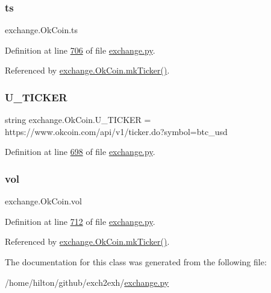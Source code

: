 \mbox{\label{classexchange_1_1_ok_coin_a0fe6263a7f58a6fa8a688929976b7e4a}} 
\subsubsection{\texorpdfstring{ts}{ts}}
{\footnotesize\ttfamily exchange.\+Ok\+Coin.\+ts}



Definition at line \hyperlink{exchange_8py_source_l00706}{706} of file \hyperlink{exchange_8py_source}{exchange.\+py}.



Referenced by \hyperlink{exchange_8py_source_l00730}{exchange.\+Ok\+Coin.\+mk\+Ticker()}.

\mbox{\label{classexchange_1_1_ok_coin_a81305ced2eb23b94feb7195d1d42afc2}} 
\subsubsection{\texorpdfstring{U\+\_\+\+T\+I\+C\+K\+ER}{U\_TICKER}}
{\footnotesize\ttfamily string exchange.\+Ok\+Coin.\+U\+\_\+\+T\+I\+C\+K\+ER = \textquotesingle{}https\+://www.\+okcoin.\+com/api/v1/ticker.\+do?symbol=btc\+\_\+usd\textquotesingle{}\hspace{0.3cm}{\ttfamily [static]}}



Definition at line \hyperlink{exchange_8py_source_l00698}{698} of file \hyperlink{exchange_8py_source}{exchange.\+py}.

\mbox{\label{classexchange_1_1_ok_coin_ad0e78d6b3c0a24504be72a0216fc6549}} 
\subsubsection{\texorpdfstring{vol}{vol}}
{\footnotesize\ttfamily exchange.\+Ok\+Coin.\+vol}



Definition at line \hyperlink{exchange_8py_source_l00712}{712} of file \hyperlink{exchange_8py_source}{exchange.\+py}.



Referenced by \hyperlink{exchange_8py_source_l00730}{exchange.\+Ok\+Coin.\+mk\+Ticker()}.



The documentation for this class was generated from the following file\+:\begin{DoxyCompactItemize}
\item 
/home/hilton/github/exch2exh/\hyperlink{exchange_8py}{exchange.\+py}\end{DoxyCompactItemize}
